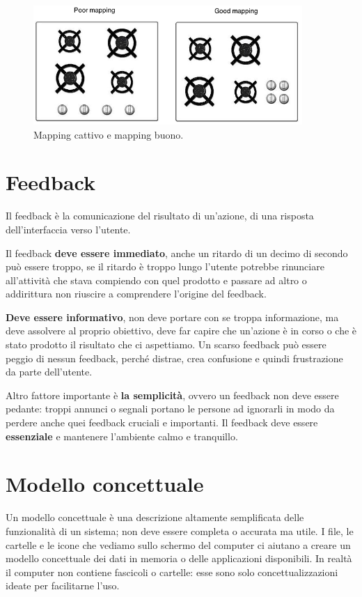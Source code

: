 \documentclass[a4paper,11pt,oneside]{book}
\begin{document}
\begin{figure}[!h]
	\centering
	\includegraphics[scale = 0.7]{immagini/mapping.png}
	\caption{Mapping cattivo e mapping buono.}
\end{figure}

\pagebreak

\section{Feedback}
Il feedback è la comunicazione del risultato di un'azione, di una risposta dell'interfaccia verso l'utente.

Il feedback \textbf{deve essere immediato}, anche un ritardo di un decimo di secondo può essere troppo, se il ritardo è troppo lungo l'utente potrebbe rinunciare all'attività che stava compiendo con quel prodotto e passare ad altro o addirittura non riuscire a comprendere l'origine del feedback.

\textbf{Deve essere informativo}, non deve portare con se troppa informazione, ma deve assolvere al proprio obiettivo, deve far capire che un'azione è in corso o che è stato prodotto il risultato che ci aspettiamo. Un scarso feedback può essere peggio di nessun feedback, perché distrae, crea confusione e quindi frustrazione da parte dell'utente.

Altro fattore importante è \textbf{la semplicità}, ovvero un feedback non deve essere pedante: troppi annunci o segnali portano le persone ad ignorarli in modo da perdere anche quei feedback cruciali e importanti. Il feedback deve essere \textbf{essenziale} e mantenere l'ambiente calmo e tranquillo.

\section{Modello concettuale}
Un modello concettuale è una descrizione altamente semplificata delle funzionalità di un sistema; non deve essere completa o accurata ma utile. I file, le cartelle e le icone che vediamo sullo schermo del computer ci aiutano a creare un modello concettuale dei dati in memoria o delle applicazioni disponibili. In realtà il computer non contiene fascicoli o cartelle: esse sono solo concettualizzazioni ideate per facilitarne l'uso.
\end{document}
